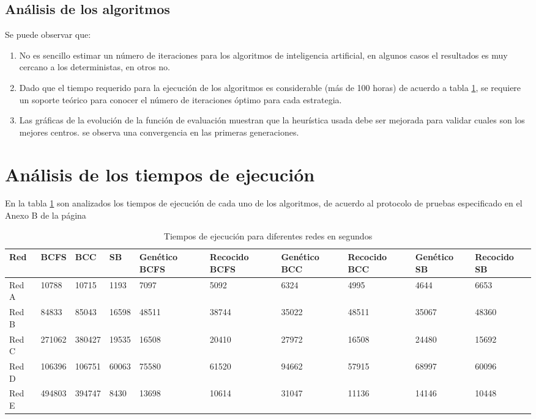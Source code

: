 \subsection{Análisis de los algoritmos}

Se puede observar que:

\begin{enumerate}
    \item No es sencillo estimar un número de iteraciones para los algoritmos de inteligencia artificial, en algunos casos el resultados es muy cercano a los deterministas, en otros no.
    \item Dado que el tiempo requerido para la ejecución de los algoritmos es considerable (más de 100 horas) de acuerdo a tabla \ref{tab:executionTimes}, se requiere un soporte teórico para conocer el número de iteraciones óptimo para cada estrategia.
    \item Las gráficas de la evolución de la función de evaluación muestran que la heurística usada debe ser mejorada para validar cuales son los mejores centros. se observa una convergencia en las primeras generaciones.
\end{enumerate}

\section{Análisis de los tiempos de ejecución}

En la tabla \ref{tab:executionTimes} son analizados los tiempos de ejecución de cada uno de los algoritmos, de acuerdo al protocolo de pruebas especificado en el Anexo B de la página \pageref{AnexoB}

\begin{table}[H]
    \centering
    \begin{tabular}{|p{1cm}|p{1cm}|p{1.1cm}|p{1cm}|p{1.5cm}|p{1.5cm}|p{1.5cm}|p{1.5cm}|p{1.5cm}|p{1.5cm}|}
         \hline
         \textbf{Red} & \textbf{BCFS} & \textbf{BCC} & \textbf{SB} & \textbf{Genético BCFS} & \textbf{Recocido BCFS} &
         \textbf{Genético BCC} & \textbf{Recocido BCC} &
         \textbf{Genético SB} & \textbf{Recocido SB} \\
         \hline
         Red A & 10788 & 10715 & 1193 & 7097 & 5092 & 6324 & 4995 &4644 & 6653 \\
         \hline
         Red B & 84833 & 85043  & 16598  & 48511  & 38744  &  35022 & 48511 & 35067 & 48360  \\
         \hline
         Red C & 271062 & 380427 & 19535  &  16508 & 20410  &  27972 & 16508 & 24480 & 15692  \\
         \hline
         Red D & 106396 & 106751 &  60063 & 75580  & 61520  & 94662  & 57915  & 68997 &  60096 \\
         \hline
         Red E & 494803 & 394747 &  8430 & 13698  & 10614  & 31047  & 11136  & 14146 &  10448 \\
         \hline
    \end{tabular}
    \caption{Tiempos de ejecución para diferentes redes en segundos}
    \label{tab:executionTimes}
\end{table}

